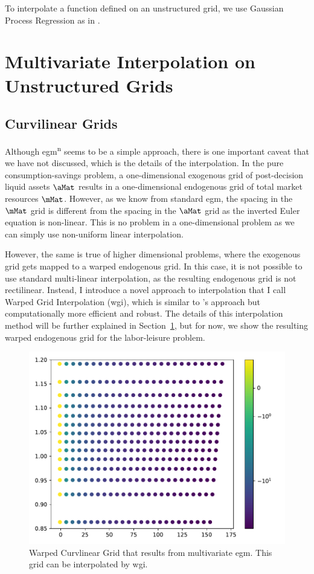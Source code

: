 \documentclass{article}
\begin{document}
To interpolate a function defined on an unstructured grid, we use Gaussian Process Regression as in \citet{Scheidegger2019}.

\section{Multivariate Interpolation on Unstructured Grids}\label{multinterp}

\subsection{Curvilinear Grids}

Although \acrshort{egm}\textsuperscript{n} seems to be a simple approach, there is one important caveat that we have not discussed, which is the details of the interpolation. In the pure consumption-savings problem, a one-dimensional exogenous grid of post-decision liquid assets $\aMat$ results in a one-dimensional endogenous grid of total market resources $\mMat$. However, as we know from standard \acrshort{egm}, the spacing in the $\mMat$ grid is different from the spacing in the $\aMat$ grid as the inverted Euler equation is non-linear. This is no problem in a one-dimensional problem as we can simply use non-uniform linear interpolation.

However, the same is true of higher dimensional problems, where the exogenous grid gets mapped to a warped endogenous grid. In this case, it is not possible to use standard multi-linear interpolation, as the resulting endogenous grid is not rectilinear. Instead, I introduce a novel approach to interpolation that I call Warped Grid Interpolation (\acrshort{wgi}), which is similar to \citet{White2015}'s approach but computationally more efficient and robust. The details of this interpolation method will be further explained in Section~\ref{multinterp}, but for now, we show the resulting warped endogenous grid for the labor-leisure problem.

\begin{figure}[!htbp]
\centering
\includegraphics[width=0.7\linewidth]{files/LaborSeparableWarped-ee17957b44f7db26890ec34a3176527d.pdf}
\caption[]{Warped Curvlinear Grid that results from multivariate \acrshort{egm}. This grid can be interpolated by \acrshort{wgi}.}
\label{fig:LaborSeparableWarpedGrid}
\end{figure}
\end{document}
